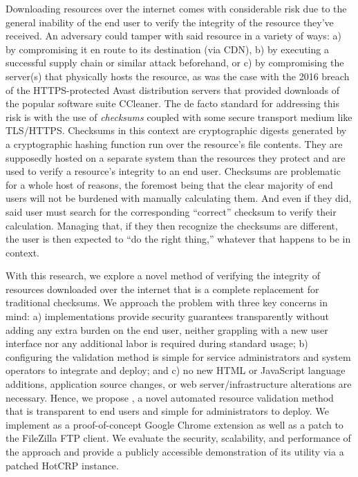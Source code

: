 Downloading resources over the internet comes with considerable risk due to the
general inability of the end user to verify the integrity of the resource
they've received. An adversary could tamper with said resource in a variety of
ways: a) by compromising it en route to its destination (\eg via CDN), b) by
executing a successful supply chain or similar attack beforehand, or c) by
compromising the server(s) that physically hosts the resource, as was the case
with the 2016 breach of the HTTPS-protected Avast distribution servers that
provided downloads of the popular software suite CCleaner. The de facto standard
for addressing this risk is with the use of \textit{checksums} coupled with some
secure transport medium like TLS/HTTPS. Checksums in this context are
cryptographic digests generated by a cryptographic hashing function run over the
resource's file contents. They are supposedly hosted on a separate system than
the resources they protect and are used to verify a resource’s integrity to an
end user. Checksums are problematic for a whole host of reasons, the foremost
being that the clear majority of end users will not be burdened with manually
calculating them. And even if they did, said user must search for the
corresponding ``correct'' checksum to verify their calculation. Managing that,
if they then recognize the checksums are different, the user is then expected to
``do the right thing,'' whatever that happens to be in context.

With this research, we explore a novel method of verifying the integrity of
resources downloaded over the internet that is a complete replacement for
traditional checksums. We approach the problem with three key concerns in mind:
a) implementations provide security guarantees transparently without adding any
extra burden on the end user, \ie neither grappling with a new user interface
nor any additional labor is required during standard usage; b) configuring the
validation method is simple for service administrators and system operators to
integrate and deploy; and c) no new HTML or JavaScript language additions,
application source changes, or web server/infrastructure alterations are
necessary. Hence, we propose \SYSTEM{}, a novel automated resource validation
method that is transparent to end users and simple for administrators to deploy.
We implement \SYSTEM{} as a proof-of-concept Google Chrome extension as well as
a patch to the FileZilla FTP client. We evaluate the security, scalability, and
performance of the \SYSTEM{} approach and provide a publicly accessible
demonstration of its utility via a patched HotCRP instance.

